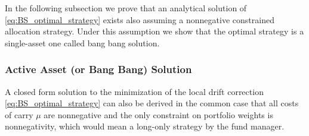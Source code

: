 \documentclass[runningheads]{m2ef}
\newcommand{\change}[1]{{\color{red} {#1}}}%
\begin{document}
\change{In the following subsection we prove that an analytical solution of \eqref{eq:BS_optimal_strategy} exists also assuming a nonnegative constrained allocation strategy. Under this assumption we show that the optimal strategy is a single-asset one called bang bang solution.}

\subsubsection{Active Asset (or Bang Bang) Solution}
A closed form solution to the minimization of the local drift correction \eqref{eq:BS_optimal_strategy} can also be derived in the common case that all costs of carry \change{$\mu$} are nonnegative and the only constraint on portfolio weights is nonnegativity, which would mean a long-only strategy by the fund manager.
\end{document}
